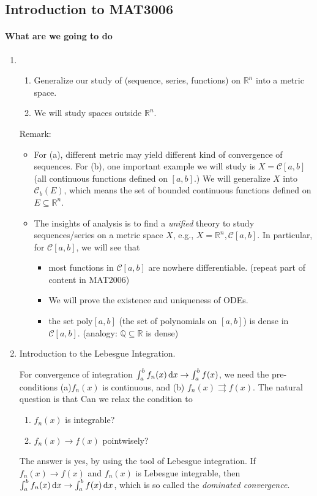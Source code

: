 \subsection{Introduction to MAT3006}
\paragraph{What are we going to do}
\begin{enumerate}
\item
\begin{enumerate}
\item
Generalize our study of (sequence, series, functions) on $\mathbb{R}^n$ into a metric space.
\item
We will study spaces outside $\mathbb{R}^n$.
\end{enumerate}
Remark: 
\begin{itemize}
\item
For (a), different metric may yield different kind of convergence of sequences. For (b), one important example we will study is $X=\mathcal{C}[a,b]$ (all continuous functions defined on $[a,b]$.) We will generalize $X$ into $\mathcal{C}_b(E)$, which means the set of bounded continuous functions defined on $E\subseteq\mathbb{R}^n$.
\item
The insights of analysis is to find a \emph{unified} theory to study sequences/series on a metric space $X$, e.g., $X=\mathbb{R}^n,\mathcal{C}[a,b]$. In particular, for $\mathcal{C}[a,b]$, we will see that 
\begin{itemize}
\item
most functions in $\mathcal{C}[a,b]$ are nowhere differentiable. (repeat part of content in MAT2006)
\item
We will prove the existence and uniqueness of ODEs.
\item
the set $\mbox{poly}[a,b]$ (the set of polynomials on $[a,b]$) is dense in $\mathcal{C}[a,b]$. (analogy: $\mathbb{Q}\subseteq\mathbb{R}$ is dense)
\end{itemize}
\end{itemize}
\item
Introduction to the Lebesgue Integration. 

For convergence of integration $\int_a^bf_n(x)\,\mathrm{d} x\to\int_a^bf(x)$, we need the pre-conditions (a)$f_n(x)$ is continuous, and (b) $f_n(x) \rightrightarrows f(x)$. The natural question is that Can we relax the condition to 
\begin{enumerate}
\item
$f_n(x)$ is integrable?
\item
$f_n(x)\to f(x)$ pointwisely?
\end{enumerate}
The answer is yes, by using the tool of Lebesgue integration. If $f_n(x)\to f(x)$ and $f_n(x)$ is Lebesgue integrable, then $\int_a^bf_n(x)\,\mathrm{d} x\to \int_a^bf(x)\,\mathrm{d} x$, which is so called the \emph{dominated convergence}.
\end{enumerate}
